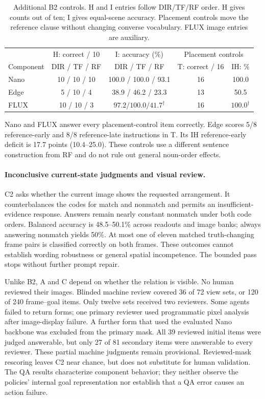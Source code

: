 \documentclass{article}
\begin{document}
\begin{table}[htbp]
\centering\small
\caption{Additional B2 controls. H and I entries follow DIR/TF/RF order. H gives counts out of ten; I gives equal-scene accuracy. Placement controls move the reference clause without changing converse vocabulary. FLUX image entries are auxiliary.}
\label{tab:vqa-controls}
\begin{tabular}{@{}lcccc@{}}
\toprule
& H: correct / 10 & I: accuracy (\%) & \multicolumn{2}{c}{Placement controls}\\
Component & DIR / TF / RF & DIR / TF / RF & T: correct / 16 & IH: \%\\
\midrule
Nano & 10 / 10 / 10 & 100.0 / 100.0 / 93.1 & 16 & 100.0\\
Edge & 5 / 10 / 4 & 38.9 / 46.2 / 23.3 & 13 & 50.5\\
FLUX & 10 / 10 / 3 & $97.2 / 100.0 / 41.7^\dagger$ & 16 & $100.0^\dagger$\\
\bottomrule
\end{tabular}
\end{table}

Nano and FLUX answer every placement-control item correctly. Edge scores 5/8 reference-early and 8/8 reference-late instructions in T. Its IH reference-early deficit is 17.7 points (10.4--25.0). These controls use a different sentence construction from RF and do not rule out general noun-order effects.

\paragraph{Inconclusive current-state judgments and visual review.}
C2 asks whether the current image shows the requested arrangement. It counterbalances the codes for match and nonmatch and permits an insufficient-evidence response. Answers remain nearly constant nonmatch under both code orders. Balanced accuracy is 48.5--50.1\% across readouts and image banks; always answering nonmatch yields 50\%. At most one of eleven matched truth-changing frame pairs is classified correctly on both frames. These outcomes cannot establish wording robustness or general spatial incompetence. The bounded pass stops without further prompt repair.

Unlike B2, A and C depend on whether the relation is visible. No human reviewed their images. Blinded machine review covered 36 of 72 view sets, or 120 of 240 frame--goal items. Only twelve sets received two reviewers. Some agents failed to return forms; one primary reviewer used programmatic pixel analysis after image-display failure. A further form that used the evaluated Nano backbone was excluded from the primary mask. All 39 reviewed initial items were judged answerable, but only 27 of 81 secondary items were answerable to every reviewer. These partial machine judgments remain provisional. Reviewed-mask rescoring leaves C2 near chance, but does not substitute for human validation. The QA results characterize component behavior; they neither observe the policies' internal goal representation nor establish that a QA error causes an action failure.
\end{document}
